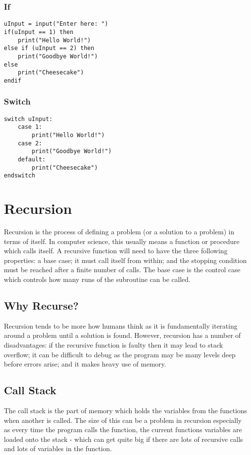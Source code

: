 \documentclass[a4paper,11pt, twocolumn]{article}
\begin{document}
\subsubsection{If}
\begin{Verbatim}[breaklines=true, breakanywhere=true]
uInput = input("Enter here: ")
if(uInput == 1) then
    print("Hello World!")
else if (uInput == 2) then
    print("Goodbye World!")
else
    print("Cheesecake")
endif
\end{Verbatim}
\subsubsection{Switch}
\begin{Verbatim}[breaklines=true, breakanywhere=true]
switch uInput:
    case 1:
        print("Hello World!")
    case 2:
        print("Goodbye World!")
    default:
        print("Cheesecake")
endswitch
\end{Verbatim}

\section{Recursion}
Recursion is the process of defining a problem (or a solution to a problem) in terms of itself. In computer science, this usually means a function or procedure which calls itself. A recursive function will need to have the three following properties: a base case; it must call itself from within; and the stopping condition must be reached after a finite number of calls. The base case is the control case which controls how many runs of the subroutine can be called.
\subsection{Why Recurse?}
Recursion tends to be more how humans think as it is fundamentally iterating around a problem until a solution is found. However, recursion has a number of disadvantages: if the recursive function is faulty then it may lead to stack overflow; it can be difficult to debug as the program may be many levels deep before errors arise; and it makes heavy use of memory.
\subsection{Call Stack}
The call stack is the part of memory which holds the variables from the functions when another is called. The size of this can be a problem in recursion especially as every time the program calls the function, the current functions variables are loaded onto the stack - which can get quite big if there are lots of recursive calls and lots of variables in the function.
\end{document}
